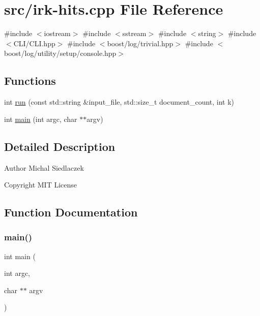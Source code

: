 \hypertarget{irk-hits_8cpp}{}\section{src/irk-\/hits.cpp File Reference}
\label{irk-hits_8cpp}
{\ttfamily \#include $<$iostream$>$}\newline
{\ttfamily \#include $<$sstream$>$}\newline
{\ttfamily \#include $<$string$>$}\newline
{\ttfamily \#include $<$C\+L\+I/\+C\+L\+I.\+hpp$>$}\newline
{\ttfamily \#include $<$boost/log/trivial.\+hpp$>$}\newline
{\ttfamily \#include $<$boost/log/utility/setup/console.\+hpp$>$}\newline
\subsection*{Functions}
\begin{DoxyCompactItemize}
\item 
int \mbox{\hyperlink{irk-hits_8cpp_a004d86ed14e88ca0ff901aa0dce269ac}{run}} (const std\+::string \&input\+\_\+file, std\+::size\+\_\+t document\+\_\+count, int k)
\item 
int \mbox{\hyperlink{irk-hits_8cpp_a3c04138a5bfe5d72780bb7e82a18e627}{main}} (int argc, char $\ast$$\ast$argv)
\end{DoxyCompactItemize}


\subsection{Detailed Description}
\begin{DoxyAuthor}{Author}
Michal Siedlaczek 
\end{DoxyAuthor}
\begin{DoxyCopyright}{Copyright}
M\+IT License 
\end{DoxyCopyright}


\subsection{Function Documentation}
\mbox{\label{irk-hits_8cpp_a3c04138a5bfe5d72780bb7e82a18e627}} 
\subsubsection{\texorpdfstring{main()}{main()}}
{\footnotesize\ttfamily int main (\begin{DoxyParamCaption}\item[{int}]{argc,  }\item[{char $\ast$$\ast$}]{argv }\end{DoxyParamCaption})}

